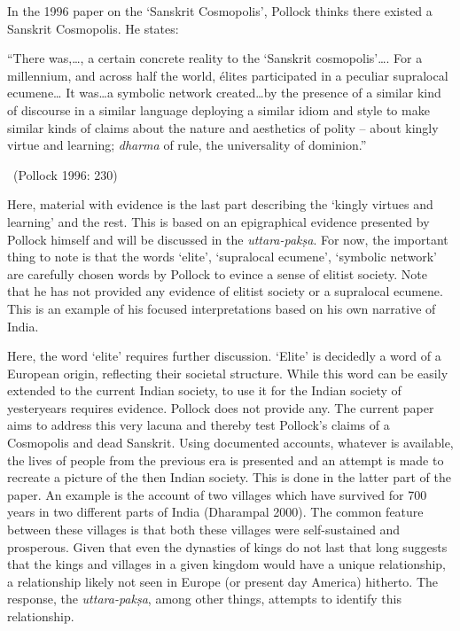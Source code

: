 In the 1996 paper on the ‘Sanskrit Cosmopolis’, Pollock thinks there existed a Sanskrit Cosmopolis. He states:

\begin{myquote}
“There was,…, a certain concrete reality to the ‘Sanskrit cosmopolis’…. For a millennium, and across half the world, élites participated in a peculiar supralocal ecumene… It was…a symbolic network created…by the presence of a similar kind of discourse in a similar language deploying a similar idiom and style to make similar kinds of claims about the nature and aesthetics of polity – about kingly virtue and learning; \textit{dharma} of rule, the universality of dominion.” 

~\hfill (Pollock 1996: 230)
\end{myquote}

Here, material with evidence is the last part describing the ‘kingly virtues and learning’ and the rest. This is based on an epigraphical evidence presented by Pollock himself and will be discussed in the \textit{uttara-pakṣa}. For now, the important thing to note is that the words ‘elite’, ‘supralocal ecumene’, ‘symbolic network’ are carefully chosen words by Pollock to evince a sense of elitist society. Note that he has not provided any evidence of elitist society or a supralocal ecumene. This is an example of his focused interpretations based on his own narrative of India.

Here, the word ‘elite’ requires further discussion. ‘Elite’ is decidedly a word of a European origin, reflecting their societal structure. While this word can be easily extended to the current Indian society, to use it for the Indian society of yesteryears requires evidence. Pollock does not provide any. The current paper aims to address this very lacuna and thereby test Pollock’s claims of a Cosmopolis and dead Sanskrit. Using documented accounts, whatever is available, the lives of people from the previous era is presented and an attempt is made to recreate a picture of the then Indian society. This is done in the latter part of the paper. An example is the account of two villages which have survived for 700 years in two different parts of India (Dharampal 2000). The common feature between these villages is that both these villages were self-sustained and prosperous. Given that even the dynasties of kings do not last that long suggests that the kings and villages in a given kingdom would have a unique relationship, a relationship likely not seen in Europe (or present day America) hitherto. The response, the \textit{uttara-pakṣa}, among other things, attempts to identify this relationship.

